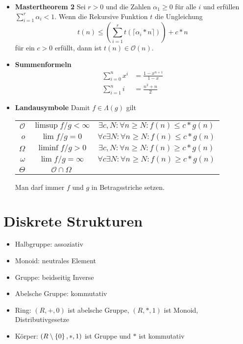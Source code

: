 \documentclass[landscape, 8pt, a4paper]{extarticle}
\newcommand{\simpleset}[1]{\ensuremath\left\{ #1 \right\}}
\renewcommand{\O}{\mathcal O}
\begin{document}
\begin{multicols}{3}
\begin{itemize}
		\item \textbf{Mastertheorem 2} Sei $r>0$ und die Zahlen $\alpha_1\geq 0$ für alle $i$ und erfüllen $\sum_{i=1}^r\alpha_i<1$.
		Wenn die Rekursive Funktion $t$ die Ungleichung
		\begin{equation*}
			t(n)\leq \left( \sum_{i=1}^r t(\lceil \alpha_i*n\rceil) \right)+c*n
		\end{equation*}
		für ein $c>0$ erfüllt, dann ist $t(n)\in\O(n)$.

		\item \textbf{Summenformeln}
		\begin{align*}
			\sum_{i=0}^n x^i &= \frac{1-x^{n+1}}{1-x}\\
			\sum_{i=1}^n i &= \frac{n^2+n}{2}
		\end{align*}

		\item \textbf{Landausymbole} Damit $f\in \Lambda(g)$ gilt

		\begin{tabular}{r|c|c}
			$\O$&$\limsup f/g<\infty$&$\exists c,N:\forall n\geq N: f(n)\leq c*g(n)$\\
			$o$&$\lim f/g=0$&$\forall c\exists N:\forall n\geq N: f(n)\leq c*g(n)$\\
			$\Omega$&$\liminf f/g>0$&$\exists c,N:\forall n\geq N: f(n)\geq c*g(n)$\\
			$\omega$&$\lim f/g=\infty$&$\forall c\exists N:\forall n\geq N: f(n)\geq c*g(n)$\\
			$\Theta$&$\O\cap\Omega$&\\
		\end{tabular}

		Man darf immer $f$ und $g$ in Betragsstriche setzen.
	\end{itemize}



	\section{Diskrete Strukturen}
	\begin{itemize}
		\item Halbgruppe: assoziativ
		\item Monoid: neutrales Element
		\item Gruppe: beidseitig Inverse
		\item Abelsche Gruppe: kommutativ
		\item Ring: $(R,+,0)$ ist abelsche Gruppe, $(R,*,1)$ ist Monoid, Distributivgesetze
		\item Körper: $(R\setminus\simpleset 0, *,1)$ ist Gruppe und $*$ ist kommutativ


\end{itemize}
\end{multicols}
\end{document}
